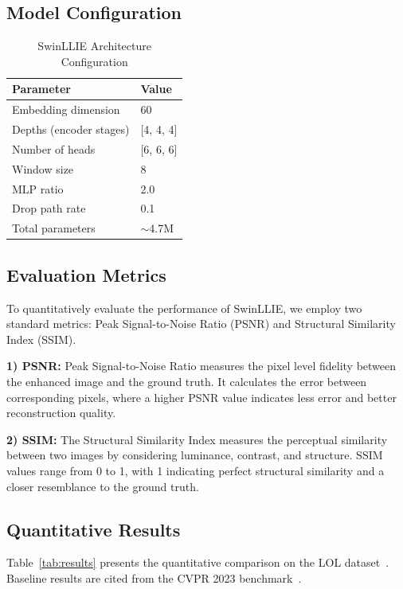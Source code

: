 \documentclass[conference]{IEEEtran}
\begin{document}
\subsection{Model Configuration}

\begin{table}[htbp]
\caption{SwinLLIE Architecture Configuration}
\centering
\begin{tabular}{ll}
\toprule
\textbf{Parameter} & \textbf{Value} \\
\midrule
Embedding dimension & 60 \\
Depths (encoder stages) & [4, 4, 4] \\
Number of heads & [6, 6, 6] \\
Window size & 8 \\
MLP ratio & 2.0 \\
Drop path rate & 0.1 \\
Total parameters & $\sim$4.7M \\
\bottomrule
\end{tabular}
\label{tab:config}
\end{table}

\subsection{Evaluation Metrics}

To quantitatively evaluate the performance of SwinLLIE, we employ two standard metrics: Peak Signal-to-Noise Ratio (PSNR) and Structural Similarity Index (SSIM).

\textbf{1) PSNR:} Peak Signal-to-Noise Ratio measures the pixel level fidelity between the enhanced image and the ground truth. It calculates the error between corresponding pixels, where a higher PSNR value indicates less error and better reconstruction quality.

\textbf{2) SSIM:} The Structural Similarity Index measures the perceptual similarity between two images by considering luminance, contrast, and structure. SSIM values range from 0 to 1, with 1 indicating perfect structural similarity and a closer resemblance to the ground truth.

\subsection{Quantitative Results}

Table~\ref{tab:results} presents the quantitative comparison on the LOL dataset~\cite{lol_dataset}. Baseline results are cited from the CVPR 2023 benchmark~\cite{xu2023smg}.
\end{document}
